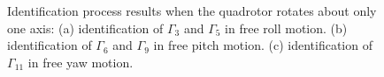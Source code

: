 \documentclass[3p]{elsarticle}
\begin{document}
\begin{figure}[H]
{    }
    \hfil
    \caption{Identification process results when the quadrotor rotates about only one axis: (a) identification of $\Gamma_3$ and $\Gamma_5$ in free roll motion. (b) identification of $\Gamma_6$ and $\Gamma_9$ in free pitch motion. (c) identification of $\Gamma_{11}$
    in free yaw motion.}
    \label{fig:one_degree_identification}
\end{figure}
\end{document}

